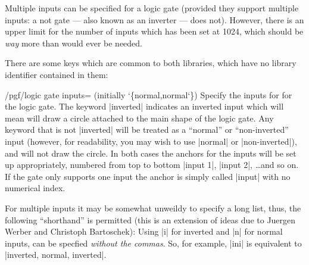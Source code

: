 	Multiple inputs can be specified for a logic gate (provided they
  support multiple inputs: a not gate --- also known as an inverter ---
  does not). However, there is an upper limit for the number of inputs 
  which has been set at 1024, which should be \emph{way} 
  more than would ever be needed.
    
  There are some \pgfname{} keys which are common to both 
  libraries, which have no library identifier contained in them:
  
  
  \begin{key}{/pgf/logic gate inputs= (initially \char`\{normal,normal\char`\})}
  Specify the inputs for for the logic gate. The keyword |inverted|
  indicates an inverted input which will mean \pgfname{} will draw a
  circle attached to the main shape of the logic gate. Any keyword
  that is not |inverted| will be treated as a ``normal'' or 
  ``non-inverted'' input (however, for readability, you may wish to 
  use |normal| or |non-inverted|), and \pgfname{} will not draw the 
  circle.  
  In both cases the anchors for the inputs will be set 
  up appropriately, numbered from top to bottom |input 1|, |input 2|,
  \ldots and so on. If the gate only supports one input the anchor
  is simply called |input| with no numerical index.
  
\begin{codeexample}[]
\end{codeexample} 
  
  For multiple inputs it may be somewhat unweildy to specify a long
  list, thus, the following ``shorthand'' is permitted (this is an  
  extension of ideas due to Juergen Werber and Christoph Bartoschek):
  Using |i| for inverted and |n| for normal inputs, 
  can be specfied \emph{without the commas}. So, for example,
  |ini| is equivalent to |inverted, normal, inverted|.
  
\begin{codeexample}[]
\end{codeexample} 
 
\end{key}


